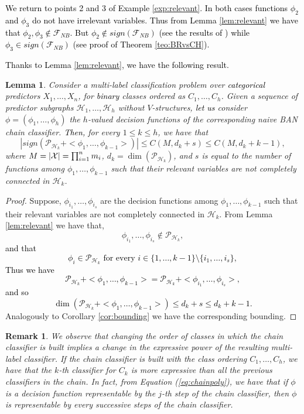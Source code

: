 \documentclass[11pt,a4paper, twoside]{book}
\newtheorem{lemma}{Lemma}[chapter]
\newtheorem{remark}{Remark}[chapter]
\newcommand{\nchi}{\mathcal{X}}
\begin{document}
\textcolor{black}{
We return to points 2 and 3 of Example \ref{exp:relevant}. In both cases functions $\phi_2$ and $\phi_3$ do not have irrelevant variables. Thus from Lemma \ref{lem:relevant} we have that $\phi_{2},\phi_{3} \notin \mathcal{F}_{NB}$. But $\phi_2 \notin sign(\mathcal{F}_{NB})$ (see the results of \cite{Ling03}) while $\phi_3 \in sign(\mathcal{F}_{NB})$ (see proof of Theorem \ref{teo:BRvsCH}).
}

\textcolor{black}{Thanks to Lemma \ref{lem:relevant}, we have the following result.}
\begin{lemma}
Consider a multi-label classification problem over \textcolor{black}{categorical} predictors $X_1,\ldots,X_n$, for \textcolor{black}{binary} classes ordered as $C_1,\ldots,C_h$. Given a sequence of predictor subgraphs $\mathcal{H}_1,\ldots,\mathcal{H}_h$ without $V$-structures, \textcolor{black}{let us} consider ${\phi}=(\phi_1,\ldots,\phi_h)$ the  $h$-valued decision functions of the corresponding naive BAN chain classifier.
\textcolor{black}{Then,} for every $1\leq k\leq h$, we have that
$$ \left| sign\left( \mathcal{P}_{\mathcal{H}_k} + <\phi_{1},\ldots,\phi_{{k-1}}>\right)\right|\leq C(M,d_k+s)\leq C(M,d_k+k-1) , $$
where $M=|{\bf \nchi}|=\prod_{i=1}^n m_i$, $d_k=\dim(\mathcal{P}_{\mathcal{H}_k})$, and $s$ is equal to the number of functions among $\phi_1,\ldots,\phi_{k-1}$ such that their relevant variables are not completely connected in $\mathcal{H}_k$.
\label{lem:boundingchain}
\end{lemma}
\begin{proof}
Suppose, $\phi_{i_1},\ldots,\phi_{i_s}$ are the decision functions among $\phi_1,\ldots,\phi_{k-1}$ such that their relevant variables are not completely connected in $\mathcal{H}_k$. From Lemma \ref{lem:relevant} we have that,
$$ \phi_{{i_1}},\ldots,\phi_{{i_s}} \notin \mathcal{P}_{\mathcal{H}_k},$$
\textcolor{black}{and that 
$$\phi_{{i}} \in \mathcal{P}_{\mathcal{H}_k} \text{ for every } i \in \{1,\ldots,k-1\}\setminus\{i_1,\ldots,i_s\},  $$
Thus we have 
$$\mathcal{P}_{\mathcal{H}_k}+<\phi_{1},\ldots,\phi_{{k-1}}>=\mathcal{P}_{\mathcal{H}_k}+<\phi_{{i_1}},\ldots,\phi_{{i_s}}>,$$
and so 
$$ \dim\left(\mathcal{P}_{\mathcal{H}_k}+<\phi_{1},\ldots,\phi_{{k-1}}>\right)\leq d_k+s \leq d_k+k-1.$$}
Analogously to Corollary \ref{cor:bounding} we have the corresponding bounding.
\end{proof} 

\begin{remark}
We observe that changing the order of classes in which the chain classifier is built implies a change in the expressive power of the resulting multi-label classifier. If the chain classifier is built with the class ordering $C_1,\ldots,C_{h}$,  we have that the $k$-th classifier for $C_{k}$ is \textit{more expressive} than all the previous classifiers in the chain.
In fact, from Equation (\ref{eq:chainpoly}), we have that if $\phi$  is a decision function representable by the $j$-th  step of the chain classifier, then $\phi$ is representable by every successive steps of the chain classifier.
\end{remark}
\end{document}
